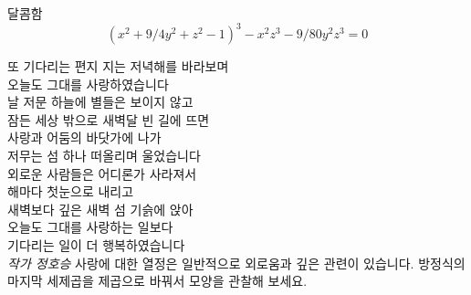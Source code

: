 ﻿\begin{surferPage}{달콤함}
\smallskip
\[(x^2+ 9/4y^2	+ z^2- 1)^3- x^2z^3	- 9/80y^2z^3	= 0\]

\singlespacing
또 기다리는 편지
\singlespacing
지는 저녁해를 바라보며\\
오늘도 그대를 사랑하였습니다\\
날 저문 하늘에 별들은 보이지 않고\\
잠든 세상 밖으로 새벽달 빈 길에 뜨면\\
사랑과 어둠의 바닷가에 나가\\
저무는 섬 하나 떠올리며 울었습니다\\
외로운 사람들은 어디론가 사라져서\\
해마다 첫눈으로 내리고\\
새벽보다 깊은 새벽 섬 기슭에 앉아\\
오늘도 그대를 사랑하는 일보다\\
기다리는 일이 더 행복하였습니다\\
{\it 작가 정호승}
\singlespacing 
사랑에 대한 열정은 일반적으로 외로움과 깊은 관련이 있습니다. 
\singlespacing 
방정식의 마지막 세제곱을 제곱으로 바꿔서 모양을 관찰해 보세요.
\end{surferPage}
